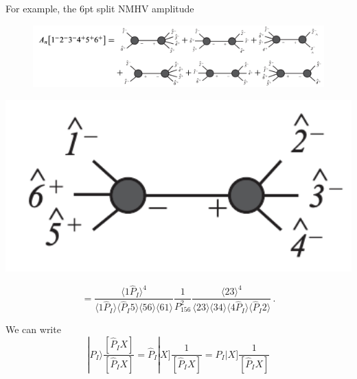 \documentclass{beamer}
\newcommand{\aket}[1]{|#1\rangle}
\newcommand{\sket}[1]{|#1]}
\newcommand{\avg}[1]{\langle #1 \rangle}
\begin{document}
\begin{frame}
    For example, the 6pt split NMHV amplitude
    \begin{figure}
        \centering
        \includegraphics[width=1\textwidth]{6ptSpNMHV.png}
    \end{figure}

    \begin{minipage}{0.33\textwidth}
    \centering
    \includegraphics[width=1\textwidth]{exNMHV.png}
\end{minipage}
\hfill
\begin{minipage}{0.66\textwidth}
    \centering
    \[
    = \frac{\avg{1\hat{P}_I}^4}{\avg{1\hat{P}_I} \avg{\hat{P}_I 5} \avg{56} \avg{61}}
    \frac{1}{P_{156}^2}
    \frac{\avg{23}^4}{\avg{23} \avg{34} \avg{4\hat{P}_I} \avg{\hat{P}_I 2}} \,.
    \]
\end{minipage}
\pause

We can write 
\begin{equation*}
    \aket{\hat{P}_I}\frac{[\hat{P}_IX]}{[\hat{P}_IX]}=\hat{P}_I\sket{X}\frac{1}{[\hat{P}_IX]}=P_I\sket{X}\frac{1}{[\hat{P}_IX]}
\end{equation*}
\end{frame}
\end{document}
